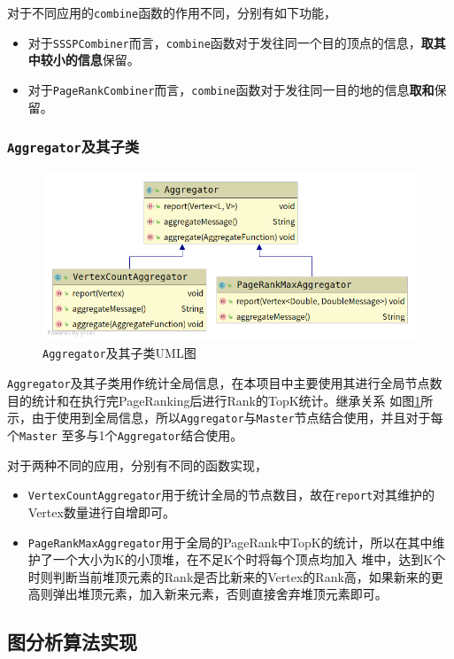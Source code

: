 \documentclass{ML}
\begin{document}
对于不同应用的\texttt{combine}函数的作用不同，分别有如下功能，
\begin{itemize}
    \item 对于\texttt{SSSPCombiner}而言，\texttt{combine}函数对于发往同一个目的顶点的信息，\textbf{取其中较小的信息}保留。
    \item 对于\texttt{PageRankCombiner}而言，\texttt{combine}函数对于发往同一目的地的信息\textbf{取和}保留。
\end{itemize}

\subsubsection{\texttt{Aggregator}及其子类}
\begin{figure}[htb]
    \centering
    \includegraphics[width=0.7\linewidth]{media/aggregator.png}
    \caption{\texttt{Aggregator}及其子类UML图}\label{fig:aggregator}
\end{figure}
\texttt{Aggregator}及其子类用作统计全局信息，在本项目中主要使用其进行全局节点数目的统计和在执行完PageRanking后进行Rank的TopK统计。继承关系
如图\ref{fig:aggregator}所示，由于使用到全局信息，所以\texttt{Aggregator}与\texttt{Master}节点结合使用，并且对于每个\texttt{Master}
至多与1个\texttt{Aggregator}结合使用。

对于两种不同的应用，分别有不同的函数实现，
\begin{itemize}
    \item \texttt{VertexCountAggregator}用于统计全局的节点数目，故在\texttt{report}对其维护的Vertex数量进行自增即可。
    \item \texttt{PageRankMaxAggregator}用于全局的PageRank中TopK的统计，所以在其中维护了一个大小为K的小顶堆，在不足K个时将每个顶点均加入
    堆中，达到K个时则判断当前堆顶元素的Rank是否比新来的Vertex的Rank高，如果新来的更高则弹出堆顶元素，加入新来元素，否则直接舍弃堆顶元素即可。
\end{itemize}

\subsection{图分析算法实现}
\end{document}
